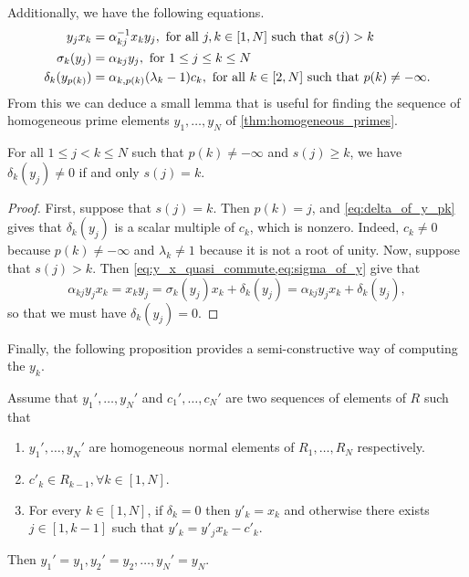 Additionally, we have the following equations.
\begin{align}\label{eq:y_x_quasi_commute}
	y_j x_k            & = \alpha_{kj}^{-1} x_k y_j, \text{ for all } j, k \in [1, N] \text{ such that } s(j) > k                                             \\
	\sigma_k (y_j)     & = \alpha_{kj}y_j, \text{ for } 1 \leq j \leq k \leq N \label{eq:sigma_of_y}                                                         \\
	\delta_k(y_{p(k)}) & = \alpha_{k, p(k)}(\lambda_k - 1)c_k, \text{ for all } k \in [2, N] \text{ such that } p(k) \neq - \infty \label{eq:delta_of_y_pk}.
\end{align}
%
From this we can deduce a small lemma that is useful for finding the sequence of homogeneous prime elements $y_1, \dots, y_N$ of \cref{thm:homogeneous_primes}.
\begin{lemma}\label{lem:delta_nonzero_iff_predecessor}
	For all $1 \leq j < k \leq N$ such that $p(k) \neq -\infty$ and $s(j) \geq k$, we have $\delta_k(y_j) \neq 0$ if and only $s(j) = k$.
\end{lemma}
\begin{proof}
	First, suppose that $s(j) = k$. Then $p(k) = j$, and \cref{eq:delta_of_y_pk} gives that $\delta_k(y_j)$ is a scalar multiple of $c_k$, which is nonzero. Indeed, $c_k \neq 0$ because $p(k) \neq -\infty$ and $\lambda_k \neq 1$ because it is not a root of unity. Now, suppose that $s(j) > k$. Then \cref{eq:y_x_quasi_commute,eq:sigma_of_y} give that
	\begin{equation*}
		\alpha_{kj}y_jx_k = x_k y_j = \sigma_k(y_j) x_k + \delta_k(y_j) = \alpha_{kj}y_j x_k + \delta_k(y_j),
	\end{equation*}
	so that we must have $\delta_k(y_j) = 0$.
\end{proof}

Finally, the following proposition provides a semi-constructive way of computing the
$y_k$.
\begin{proposition}\label{prop:constructive_hom_primes}
	Assume that $y_1', \dots, y_N'$ and $c_1',\dots, c_N'$ are two sequences of elements of $R$ such that
	\begin{enumerate}
		\item $y_1', \dots, y_N'$ are homogeneous normal elements of $R_1, \dots, R_N$ respectively.
		\item $c'_k \in R_{k-1}, \forall k \in [1, N]$.
		\item For every $k \in [1, N]$, if $\delta_k = 0$ then $y'_k = x_k$ and otherwise there
		      exists $j \in [1, k-1]$ such that $y'_k = y'_j x_k - c'_k$.
	\end{enumerate}
	Then $y_1' = y_1, y_2' = y_2, \dots, y_N' = y_N$.
\end{proposition}

